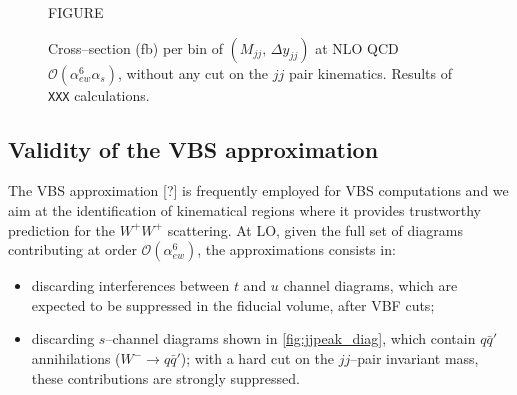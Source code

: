 \begin{figure}[hbt]
\centering
FIGURE
\caption{Cross--section (fb) per bin of $(M_{jj},\,\Delta y_{jj})$ at NLO QCD $\mathcal{O}(\alpha_{ew}^6\alpha_s)$, without any cut on the $jj$ pair kinematics. Results of \texttt{XXX} calculations.}\label{fig:mjjdyjj_2d_NLO}
\end{figure}
\newpage

\subsection{Validity of the VBS approximation}\label{subsec:VBSapprox}

The VBS approximation [?] is frequently employed for VBS computations and we aim at the identification of kinematical regions where it provides trustworthy prediction for the $W^+W^+$ scattering.
At LO, given the full set of diagrams contributing at order $\mathcal{O}(\alpha_{ew}^6)$, the approximations consists in:
\begin{itemize}
\item discarding interferences between $t$ and $u$ channel diagrams, which are expected to be suppressed in the fiducial volume, after VBF cuts;
\item discarding $s$--channel diagrams shown in \autoref{fig:jjpeak_diag}, which contain $q\bar{q}'$ annihilations ($W^-\rightarrow q \bar{q}'$); with a hard cut on the $jj$--pair invariant mass, these contributions are strongly suppressed.
\end{itemize}

